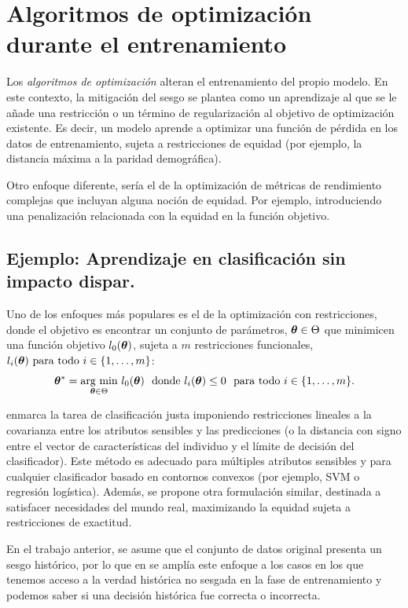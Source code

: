 \documentclass[oneside,openright,titlepage,numbers=noenddot,openany,headinclude,footinclude=true,
cleardoublepage=empty,abstractoff,BCOR=5mm,paper=a4,fontsize=12pt,main=spanish]{scrreprt}
\begin{document}
\section{Algoritmos de optimización durante el entrenamiento}

Los \textit{algoritmos de optimización} alteran el entrenamiento del propio modelo. En este contexto, la mitigación del sesgo se plantea como un aprendizaje al que se le añade una restricción o un término de regularización al objetivo de optimización existente. Es decir, un modelo aprende a optimizar una función de pérdida en los datos de entrenamiento, sujeta a restricciones de equidad (por ejemplo, la distancia máxima a la paridad demográfica).

Otro enfoque diferente, sería el de la optimización de métricas de rendimiento complejas que incluyan alguna noción de equidad. Por ejemplo, introduciendo una penalización relacionada con la equidad en la función objetivo.

\subsection{Ejemplo: Aprendizaje en clasificación sin impacto dispar.}

Uno de los enfoques más populares es el de la optimización con restricciones, donde el objetivo es encontrar un conjunto de parámetros, $\bm{\theta} \in \Theta$ que minimicen una función objetivo $l_0(\bm{\theta})$, sujeta a $m$ restricciones funcionales, $l_i(\btheta) \ \text{para todo} \ i \in \{1,\dots,m\}$: $$\bm{\theta}^\ast = \underset{\bm{\theta} \in \Theta}{\text{arg min}}  \ l_0(\bm{\theta}) \ \ \text{donde} \ l_i(\bm{\theta}) \leq 0 \ \ \text{para todo} \ i \in \{1,\dots,m\}.$$

\cite{constraints2017} enmarca la tarea de clasificación justa imponiendo restricciones lineales a la covarianza entre los atributos sensibles y las predicciones (o la distancia con signo entre el vector de características del individuo y el límite de decisión del clasificador). Este método es adecuado para múltiples atributos sensibles y para cualquier clasificador basado en contornos convexos (por ejemplo, SVM o regresión logística). Además, se propone otra formulación similar, destinada a satisfacer necesidades del mundo real, maximizando la equidad sujeta a restricciones de exactitud. 

En el trabajo anterior, se asume que el conjunto de datos original presenta un sesgo histórico, por lo que en \cite{disparate2017} se amplía este enfoque a los casos en los que tenemos acceso a la verdad histórica no sesgada en la fase de entrenamiento y podemos saber si una decisión histórica fue correcta o incorrecta.
\end{document}
